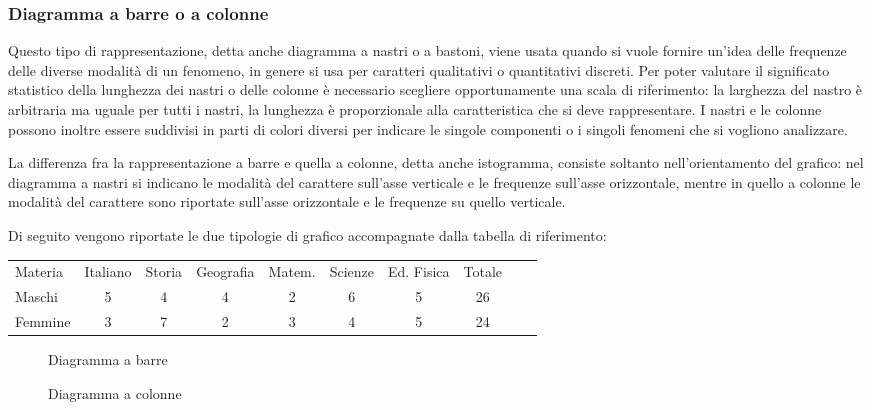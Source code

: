 \subsubsection{Diagramma a barre o a colonne}
Questo tipo di rappresentazione, detta anche diagramma a nastri o a 
bastoni, viene usata quando si vuole fornire un'idea delle frequenze
delle diverse modalità di un fenomeno, in genere si usa per caratteri 
qualitativi o quantitativi discreti.
Per poter valutare il significato statistico della lunghezza dei nastri o 
delle colonne è necessario scegliere opportunamente una scala di 
riferimento:
la larghezza del nastro è arbitraria ma uguale per tutti i nastri, la 
lunghezza è proporzionale alla caratteristica che si deve rappresentare.
I nastri e le colonne possono inoltre essere suddivisi in parti di colori 
diversi per indicare le singole componenti o i singoli fenomeni
che si vogliono analizzare.

La differenza fra la rappresentazione a barre e quella a colonne, detta 
anche istogramma, consiste soltanto
nell'orientamento del grafico: nel diagramma a nastri si indicano le 
modalità del carattere sull'asse verticale e le frequenze sull'asse 
orizzontale,
mentre in quello a colonne le modalità del carattere sono riportate 
sull'asse
orizzontale e le frequenze su quello verticale.

Di seguito vengono riportate le due tipologie di grafico accompagnate dalla 
tabella di riferimento:

\begin{center}
 \begin{tabularx}{.95\textwidth}{X*{7}{c}Xc}
\toprule
Materia& Italiano &Storia & Geografia & Matem. & Scienze & Ed. Fisica & 
Totale\\
Maschi & 5 & 4& 4 & 2& 6 & 5& 26\\
Femmine & 3 & 7 & 2 & 3  & 4 & 5 & 24\\
\bottomrule
\end{tabularx}
\end{center}
\begin{center}
\begin{figure}[!h]
\begin{minipage}{.5\textwidth}
\begin{inaccessibleblock}
\scalebox{.8}{}
\caption{Diagramma a barre}
\end{inaccessibleblock}
\end{minipage} 
\begin{minipage}{.5\textwidth}
\begin{inaccessibleblock}
 \scalebox{.8}{}
\caption{Diagramma a colonne}
\end{inaccessibleblock}
\end{minipage}
\end{figure}
\end{center}

